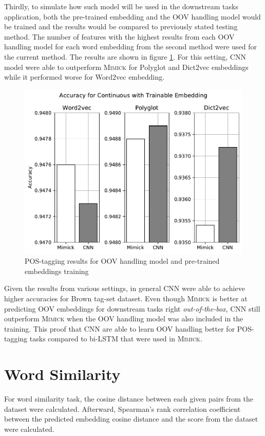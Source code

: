       Thirdly, to simulate how such model will be used in the
      downstream tasks application, both the pre-trained embedding and
      the OOV handling model would be trained and the results would be
      compared to previously stated testing method. The number of
      features with the highest results from each OOV handling model
      for each word embedding from the second method were used for the
      current method. The results are shown in figure
      \ref{fig:postag_train_embed_results}. For this setting, CNN
      model were able to outperform \textsc{Mimick} for Polyglot and
      Dict2vec embeddings while it performed worse for Word2vec
      embedding.
      \begin{figure}[H]
        \centering
        \includegraphics[width=0.8\linewidth]{images/train_embed.pdf}
        \caption{POS-tagging results for OOV handling model and pre-trained embeddings training}
        \label{fig:postag_train_embed_results}
      \end{figure}
      
      Given the results from various settings, in general CNN were
      able to achieve higher accuracies for Brown tag-set dataset.
      Even though \textsc{Mimick} is better at predicting OOV
      embeddings for downstream tasks right \textit{out-of-the-box},
      CNN still outperform \textsc{Mimick} when the OOV handling model
      was also included in the training. This proof that CNN are able
      to learn OOV handling better for POS-tagging tasks compared to
      bi-LSTM that were used in \textsc{Mimick}.

    \section{Word Similarity}
    For word similarity task, the cosine distance between each given
    pairs from the dataset were calculated. Afterward, Spearman's rank
    correlation coefficient between the predicted embedding cosine
    distance and the score from the dataset were calculated.

